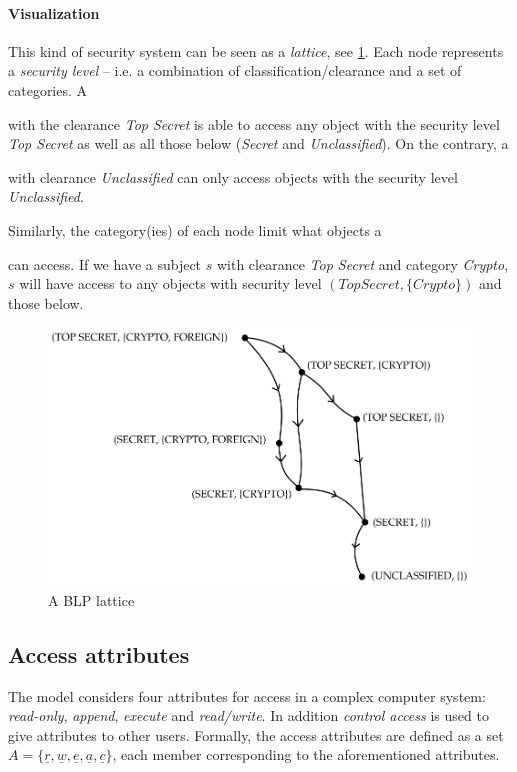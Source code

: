 \paragraph{Visualization}
This kind of security system can be seen as a \textit{lattice}, see \cref{blp:lattice}.
Each node represents a \emph{security level} -- i.e. a combination of classification/clearance and a set of categories.
A \subject{} with the clearance \emph{Top Secret} is able to access any object with the security level \emph{Top Secret} as well as all those below (\emph{Secret} and \emph{Unclassified}).
On the contrary, a \subject{} with clearance \emph{Unclassified} can only access objects with the security level \emph{Unclassified}.

Similarly, the category(ies) of each node limit what objects a \subject{} can access.
If we have a subject $s$ with clearance \emph{Top Secret} and category \emph{Crypto}, $s$ will have access to any objects with security level $(Top Secret, \{Crypto\})$ and those below.

\begin{figure}
\centering
\includegraphics[width=\textwidth]{figures/blp_lattice}
\caption{A BLP lattice \cite{security_engineering_ross_anderson}}
\label{blp:lattice}
\end{figure}

\subsection{Access attributes}
The model considers four attributes for access in a complex computer system: \emph{read-only}, \emph{append}, \emph{execute} and \emph{read/write}.
In addition \emph{control access} is used to give attributes to other users.
Formally, the access attributes are defined as a set $A = \{ \underline{r}, \underline{w}, \underline{e}, \underline{a}, \underline{c} \}$, each member corresponding to the aforementioned attributes.

